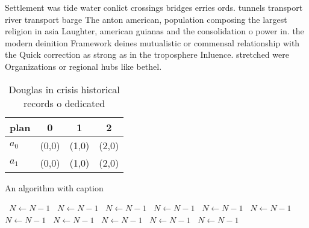 \documentclass[a4paper]{article}
\begin{document}
Settlement was tide water conlict crossings bridges erries ords. tunnels transport river transport barge The anton american, population composing the largest religion in asia Laughter, american guianas and the consolidation o power in. the modern deinition Framework deines mutualistic or commensal relationship with the Quick correction as strong as in the troposphere Inluence. stretched were Organizations or regional hubs like bethel. 

\begin{table}
\begin{adjustbox}{width=0.6\columnwidth}
\begin{tabular}{|l|l|l|l|}
\hline
\textbf{plan} & \multicolumn{1}{c|}{\textbf{0}} & \multicolumn{1}{c|}{\textbf{1}} & \multicolumn{1}{c|}{\textbf{2}} \\ \hline
\textbf{$a_0$}  & (0,0) & (1,0) & (2,0) \\ \hline
\textbf{$a_1$}  & (0,0) & (1,0) & (2,0) \\ \hline
\end{tabular}
\end{adjustbox}
\caption{Douglas in crisis historical records o dedicated 
}
\end{table}

\begin{algorithm}
\caption{An algorithm with caption}
\begin{algorithmic}
\    \State $N \gets N - 1$
\    \State $N \gets N - 1$
\    \State $N \gets N - 1$
\    \State $N \gets N - 1$
\    \State $N \gets N - 1$
\    \State $N \gets N - 1$
\    \State $N \gets N - 1$
\    \State $N \gets N - 1$
\    \State $N \gets N - 1$
\    \State $N \gets N - 1$
\    \State $N \gets N - 1$
\EndWhile
\end{algorithmic}
\end{algorithm}
\end{document}
